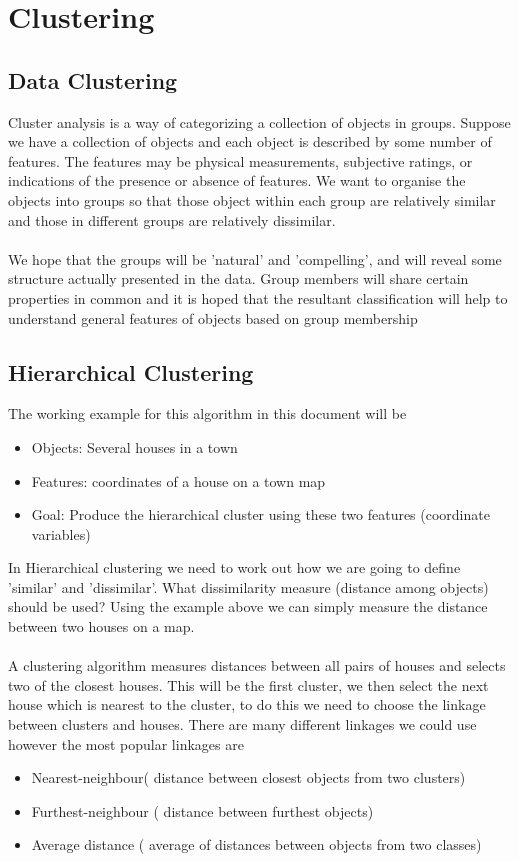 \section{Clustering}
\subsection{Data Clustering}
Cluster analysis is a way of categorizing a collection of objects in groups. Suppose we have a collection of objects and each object is described by some number of features. The features may be physical measurements, subjective ratings, or indications of the presence or absence of features. We want to organise the objects into groups so that those object within each group are relatively similar and those in different groups are relatively dissimilar.
\\\\
We hope that the groups will be 'natural' and 'compelling', and will reveal some structure actually presented in the data. Group members will share certain properties in common and it is hoped that the resultant classification will help to understand general features of objects based on group membership
\subsection{Hierarchical Clustering}
The working example for this algorithm in this document will be 
\begin{itemize}
    \item Objects: Several houses in a town
    \item Features: coordinates of a house on a town map
    \item Goal: Produce the hierarchical cluster using these two features (coordinate variables)
\end{itemize}
In Hierarchical clustering we need to work out how we are going to define 'similar' and 'dissimilar'. What dissimilarity measure (distance among objects) should be used? Using the example above we can simply measure the distance between two houses on a map.
\\\\
A clustering algorithm measures distances between all pairs of houses and selects two of the closest houses. This will be the first cluster, we then select the next house which is nearest to the cluster, to do this we need to choose the linkage between clusters and houses. There are many different linkages we could use however the most popular linkages are
\begin{itemize}
    \item Nearest-neighbour( distance between closest objects from two clusters)
    \item Furthest-neighbour ( distance between furthest objects)
    \item Average distance ( average of distances between objects from two classes)
\end{itemize}
